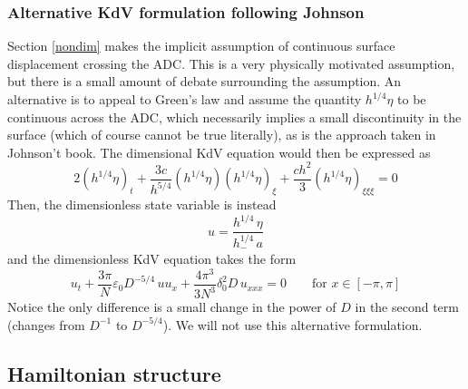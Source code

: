 \documentclass[11pt]{article}
\newcommand{\eps}{\varepsilon}
\newcommand{\depth}{h}
\newcommand{\dup}{\depth_{-}}
\newcommand{\freqp}{f_p}
\newcommand{\lam}{\lambda}
\newcommand{\lamfac}{N}
\newcommand{\amp}{a}
\newcommand{\epsup}{\eps_0}
\newcommand{\delup}{\delta_0}
\newcommand{\drat}{D}
\begin{document}
\begin{comment}
{\bf Sidenote}: In the case of constant depth, if one simply uses the most naive scales, $u = \eta/\amp$, $\tilde{x} = \xi/\lam$, $\tilde{t} = t \freqp$, then the dimensionless KdV is the more standard one:
\begin{equation}
2 u_t + 3 \eps u u_x + \frac{\delta^2}{3} u_{xxx} = 0
\end{equation}
where $\eps = a/h$ and $\delta = h/\lam$.
\end{comment}


\subsubsection{Alternative KdV formulation following Johnson}
Section \ref{nondim} makes the implicit assumption of continuous surface displacement crossing the ADC. This is a very physically motivated assumption, but there is a small amount of debate surrounding the assumption. An alternative is to appeal to Green's law and assume the quantity $\depth^{1/4} \eta$ to be continuous across the ADC, which necessarily implies a small discontinuity in the surface (which of course cannot be true literally), as is the approach taken in Johnson't book. The dimensional KdV equation would then be expressed as
\begin{equation}
2 (\depth^{1/4} \eta)_t + \frac{3 c}{\depth^{5/4}} (\depth^{1/4} \eta) (\depth^{1/4} \eta)_{\xi} + \frac{c \depth^2}{3} (\depth^{1/4} \eta)_{\xi \xi \xi} = 0
\end{equation}
Then, the dimensionless state variable is instead 
\begin{equation}
u = \frac{\depth^{1/4} \, \eta}{ \dup^{1/4} \, \amp}
\end{equation}
and the dimensionless KdV equation takes the form
\begin{equation}
u_t + \frac{3 \pi}{\lamfac} \epsup \drat^{-5/4} \, u u_x + \frac{4 \pi^3}{3 \lamfac^3} \delup^2 \drat \, u_{xxx} = 0
\qquad \text{for } x \in [-\pi,\pi]
\end{equation}
Notice the only difference is a small change in the power of $\drat$ in the second term (changes from $\drat^{-1}$ to $\drat^{-5/4}$).
We will not use this alternative formulation.




\subsection{Hamiltonian structure}
\end{document}
